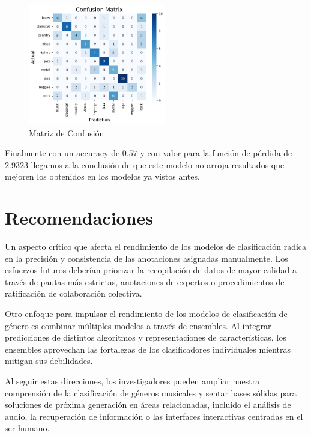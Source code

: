 \documentclass[colorinlistoftodos,twoside,twocolumn,10pt]{article} %
\begin{document}
\begin{figure}[h!]
	
	\centering
	\includegraphics[width=6cm]{vl_confussion_matrix.png}
	\caption{Matriz de Confusi\'on}
\end{figure}

Finalmente con un accuracy de $0.57$ y con valor para la funci\'on de p\'erdida de  $2.9323$ llegamos a la conclusi\'on de que este modelo no arroja resultados que mejoren los obtenidos en los modelos ya vistos antes.

	\section{Recomendaciones}
  
Un aspecto cr\'itico que afecta el rendimiento de los modelos de clasificaci\'on radica en la precisi\'on y consistencia de las anotaciones asignadas manualmente. Los esfuerzos futuros deber\'ian priorizar la recopilaci\'on de datos de mayor calidad a trav\'es de pautas m\'as estrictas, anotaciones de expertos o procedimientos de ratificaci\'on de colaboraci\'on colectiva.

Otro enfoque para impulsar el rendimiento de los modelos de clasificaci\'on de g\'enero es combinar m\'ultiples modelos a trav\'es de ensembles. Al integrar predicciones de distintos algoritmos y representaciones de caracter\'isticas, los ensembles aprovechan las fortalezas de los clasificadores individuales mientras mitigan sus debilidades.  

  Al seguir estas direcciones, los investigadores pueden ampliar nuestra comprensi\'on de la clasificaci\'on de g\'eneros musicales y sentar bases s\'olidas para soluciones de pr\'oxima generaci\'on en \'areas relacionadas, incluido el an\'alisis de audio, la recuperaci\'on de informaci\'on o las interfaces interactivas centradas en el ser humano.
  
\end{document}
